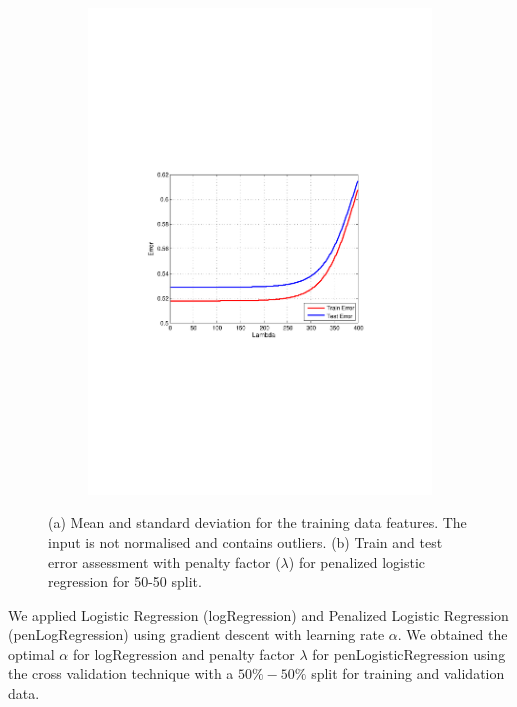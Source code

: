 \begin{figure}[h]
\begin{subfigure}[b]{0.42\textwidth}
   \includegraphics[clip, trim=4cm 9cm 3cm 10cm, width=\textwidth]{figures/Lambda_pLG.pdf}
    \label{fig:Lambda_pLr}
  \end{subfigure}
  \hfill
  \caption{(a) Mean and standard deviation for the training data features. The input is not normalised and contains outliers. (b) Train and test error assessment with penalty factor ($\lambda$) for penalized logistic regression for 50-50 split.}
\end{figure}

We applied Logistic Regression (logRegression) and Penalized Logistic Regression (penLogRegression) using gradient descent with learning rate $\alpha$.  We obtained the optimal $\alpha$ for logRegression and penalty factor $\lambda$ for penLogisticRegression using the cross validation technique with a $50\%-50\%$ split for training and validation data.

